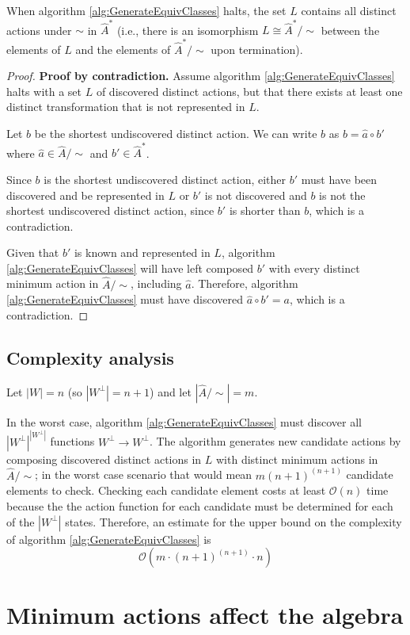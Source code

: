 \begin{proposition}
    When algorithm \ref{alg:GenerateEquivClasses} halts, the set $L$ contains all distinct actions under $\sim$ in $\hat{A}^{*}$ (i.e., there is an isomorphism $L \cong \hat{A}^{*}/\sim$ between the elements of $L$ and the elements of $\hat{A}^{*}/\sim$ upon termination).
\end{proposition}
\begin{proof}
    \textbf{Proof by contradiction.}
    Assume algorithm \ref{alg:GenerateEquivClasses} halts with a set $L$ of discovered distinct actions, but that there exists at least one distinct transformation that is not represented in $L$.

    Let $b$ be the shortest undiscovered distinct action.
    We can write $b$ as $b = \hat{a} \circ b'$ where $\hat{a} \in \hat{A}/\sim$ and $b' \in \hat{A}^{\ast}$.

    Since $b$ is the shortest undiscovered distinct action, either $b'$ must have been discovered and be represented in $L$ or $b'$ is not discovered and $b$ is not the shortest undiscovered distinct action, since $b'$ is shorter than $b$, which is a contradiction.

    Given that $b'$ is known and represented in $L$, algorithm \ref{alg:GenerateEquivClasses} will have left composed $b'$ with every distinct minimum action in $\hat{A}/\sim$, including $\hat{a}$.
    Therefore, algorithm \ref{alg:GenerateEquivClasses} must have discovered $\hat{a} \circ b' = a$, which is a contradiction.
\end{proof}


\subsection{
Complexity analysis
}

Let $|W| = n$ (so $|W^{\bot}| = n+1$) and let $|\hat{A}/\sim| = m$.

In the worst case, algorithm \ref{alg:GenerateEquivClasses} must discover all $|W^{\bot}|^{|W^{\bot}|}$ functions $W^{\bot} \to W^{\bot}$.
The algorithm generates new candidate actions by composing discovered distinct actions in $L$ with distinct minimum actions in $\hat{A}/\sim$; in the worst case scenario that would mean $m (n+1)^{(n+1)}$ candidate elements to check.
Checking each candidate element costs at least $\mathcal{O}(n)$ time because the the action function for each candidate must be determined for each of the $|W^{\bot}|$ states.
Therefore, an estimate for the upper bound on the complexity of algorithm \ref{alg:GenerateEquivClasses} is
\begin{equation}
    \mathcal{O}(m \cdot (n+1)^{(n+1)} \cdot n)
\end{equation}





\section{Minimum actions affect the algebra}
